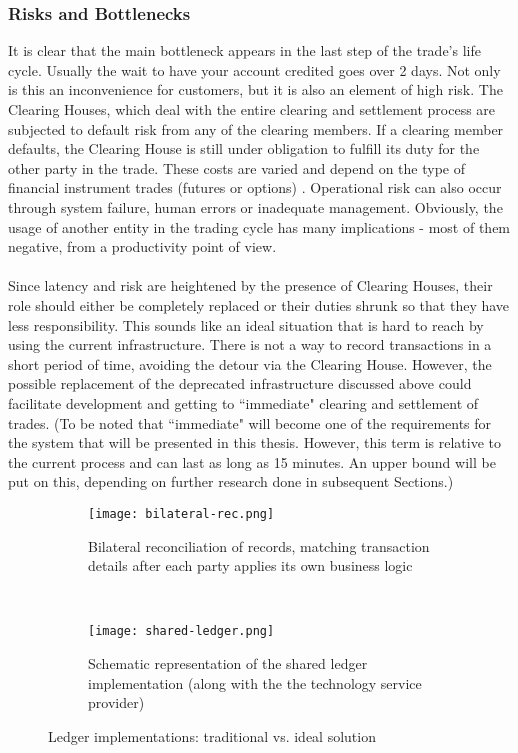 \documentclass[12pt,twoside]{article}
\begin{document}
\subsubsection{Risks and Bottlenecks}
\label{sub:Risks}
It is clear that the main bottleneck appears in the last step of the trade's life cycle. Usually the wait to have your account credited goes over 2 days. Not only is this an inconvenience for customers, but it is also an element of high risk. The Clearing Houses, which deal with the entire clearing and settlement process are subjected to default risk from any of the clearing members. If a clearing member defaults, the Clearing House is still under obligation to fulfill its duty for the other party in the trade. These costs are varied and depend on the type of financial instrument trades (futures or options) \cite{CHRisk}. Operational risk can also occur through system failure, human errors or inadequate management. Obviously, the usage of another entity in the trading cycle has many implications - most of them negative, from a productivity point of view.
\\ \\
Since latency and risk are heightened by the presence of Clearing Houses, their role should either be completely replaced or their duties shrunk so that they have less responsibility. This sounds like an ideal situation that is hard to reach by using the current infrastructure. There is not a way to record transactions in a short period of time, avoiding the detour via the Clearing House. However, the possible replacement of the deprecated infrastructure discussed above could facilitate development and getting to ``immediate" clearing and settlement of trades. (To be noted that ``immediate" will become one of the requirements for the system that will be presented in this thesis. However, this term is relative to the current process and can last as long as 15 minutes. An upper bound will be put on this, depending on further research done in subsequent Sections.) \\
\begin{figure}[!htb]
    \centering
    \begin{subfigure}[b]{0.48\textwidth}
    	\centering
        \texttt{[image: bilateral-rec.png]}
        \caption{Bilateral reconciliation of records, matching transaction details after each party applies its own business logic}
        \label{fig:bilateral}
    \end{subfigure}
    ~
    \begin{subfigure}[b]{0.48\textwidth}
    	\centering
        \texttt{[image: shared-ledger.png]}
        \caption{Schematic representation of the shared ledger implementation (along with the the technology service provider)}
        \label{fig:shared}
    \end{subfigure}
    \caption{Ledger implementations: traditional vs. ideal solution \cite{Corda:IP}}
    \label{fig:reconciliation}
\end{figure}
\end{document}
